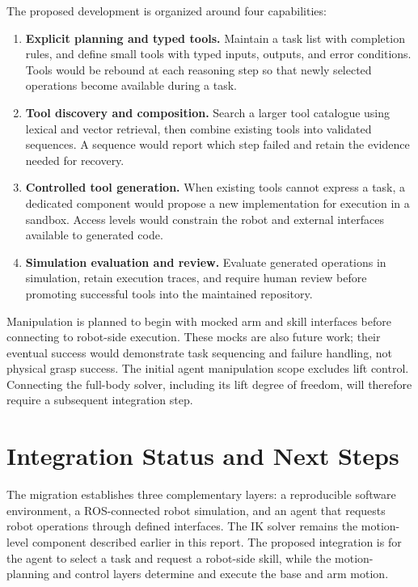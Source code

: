 \documentclass[12pt,a4paper]{article}
\begin{document}
The proposed development is organized around four capabilities:
\begin{enumerate}
    \item \textbf{Explicit planning and typed tools.}
    Maintain a task list with completion rules, and define small tools
    with typed inputs, outputs, and error conditions. Tools would be
    rebound at each reasoning step so that newly selected operations
    become available during a task.
    \\
    \item \textbf{Tool discovery and composition.}
    Search a larger tool catalogue using lexical and vector retrieval,
    then combine existing tools into validated sequences. A sequence
    would report which step failed and retain the evidence needed for
    recovery.

    \item \textbf{Controlled tool generation.}
    When existing tools cannot express a task, a dedicated component
    would propose a new implementation for execution in a sandbox.
    Access levels would constrain the robot and external interfaces
    available to generated code.

    \item \textbf{Simulation evaluation and review.}
    Evaluate generated operations in simulation, retain execution
    traces, and require human review before promoting successful tools
    into the maintained repository.
\end{enumerate}

Manipulation is planned to begin with mocked arm and skill interfaces
before connecting to robot-side execution. These mocks are also future
work; their eventual success would demonstrate task sequencing and
failure handling, not physical grasp success. The initial agent
manipulation scope excludes lift control. Connecting the full-body
solver, including its lift degree of freedom, will therefore require
a subsequent integration step.

\clearpage
\section*{Integration Status and Next Steps}

The migration establishes three complementary layers: a reproducible
software environment, a ROS-connected robot simulation, and an agent
that requests robot operations through defined interfaces. The IK
solver remains the motion-level component described earlier in this
report. The proposed integration is for the agent to select a task
and request a robot-side skill, while the motion-planning and control
layers determine and execute the base and arm motion.
\end{document}
